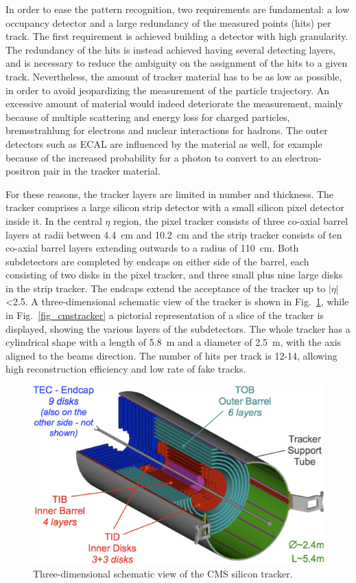 In order to ease the pattern recognition, two requirements are fundamental:
a low occupancy detector and a large redundancy of the measured points (hits) per track.
The first requirement is achieved building a detector with high granularity. The
redundancy of the hits is instead achieved having several detecting layers, and is
necessary to reduce the ambiguity on the assignment of the hits to a given track.
Nevertheless, the amount of tracker material has to be as low as possible, in order to
avoid jeopardizing the measurement of the particle trajectory. An excessive amount
of material would indeed deteriorate the measurement, mainly because
of multiple scattering and energy loss for charged particles,
bremsstrahlung for electrons and nuclear interactions for hadrons.
The outer detectors such as ECAL are influenced by the material as
well, for example because of the increased probability 
for a photon to convert to an electron-positron pair in the tracker
material.

For these
reasons, the tracker layers are limited in number and thickness. The tracker comprises
a large silicon strip detector with a small silicon pixel detector inside it. In the central
$\eta$ region, the pixel tracker consists of three co-axial barrel layers at radii between
4.4~cm and 10.2~cm and the strip tracker consists of ten co-axial barrel layers extending
outwards to a radius of 110~cm. Both subdetectors are completed by endcaps on either
side of the barrel, each consisting of two disks in the pixel tracker, and three small
plus nine large disks in the strip tracker. The endcaps extend the acceptance of the
tracker up to $|\eta|$<2.5. A three-dimensional schematic view of the tracker is shown in
Fig.~\ref{trk}, while in Fig.~\ref{fig_cmstracker} a pictorial representation of a slice of the tracker is displayed,
showing the various layers of the subdetectors.
The whole tracker has a cylindrical shape with a length of 5.8~m and a diameter
of 2.5~m, with the axis aligned to the beams direction. The number of hits
per track is 12-14, allowing high reconstruction efficiency and low rate of fake tracks.

\begin{figure}
\centering
\includegraphics[scale= 0.5]{../Cap2/trk}
\caption{Three-dimensional schematic view of the CMS silicon tracker.}
\label{trk}
\end{figure}

